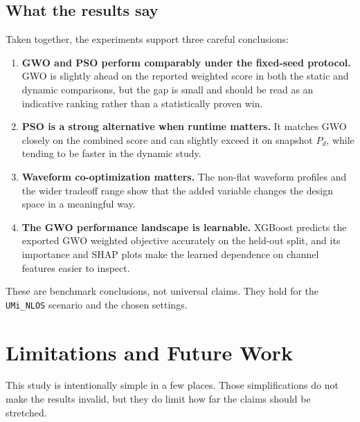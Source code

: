 \documentclass[runningheads]{llncs}
\begin{document}
\subsection{What the results say}
Taken together, the experiments support three careful conclusions:
\begin{enumerate}
  \item \textbf{GWO and PSO perform comparably under the fixed-seed protocol.} GWO is slightly ahead on the reported weighted score in both the static and dynamic comparisons, but the gap is small and should be read as an indicative ranking rather than a statistically proven win.
  \item \textbf{PSO is a strong alternative when runtime matters.} It matches GWO closely on the combined score and can slightly exceed it on snapshot $P_d$, while tending to be faster in the dynamic study.
  \item \textbf{Waveform co-optimization matters.} The non-flat waveform profiles and the wider tradeoff range show that the added variable changes the design space in a meaningful way.
  \item \textbf{The GWO performance landscape is learnable.} XGBoost predicts the exported GWO weighted objective accurately on the held-out split, and its importance and SHAP plots make the learned dependence on channel features easier to inspect.
\end{enumerate}

These are benchmark conclusions, not universal claims. They hold for the \texttt{UMi\_NLOS} scenario and the chosen settings.

\section{Limitations and Future Work}
This study is intentionally simple in a few places. Those simplifications do not make the results invalid, but they do limit how far the claims should be stretched.
\end{document}
